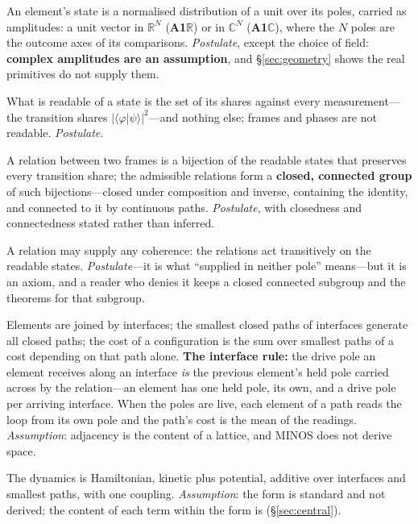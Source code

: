 \documentclass[11pt,a4paper]{article}
\theoremstyle{plain}
\theoremstyle{definition}
\theoremstyle{remark}
\newcommand{\R}{\mathbb{R}}
\newcommand{\C}{\mathbb{C}}
\begin{document}
\begin{tcolorbox}[paperbox, title=The axioms]
\begin{description}[leftmargin=1.5em,style=nextline]
\item[A1 --- the state.] An element's state is a normalised distribution of a unit over its poles, carried as amplitudes: a unit vector in $\R^N$ (\textbf{A1$\R$}) or in $\C^N$ (\textbf{A1$\C$}), where the $N$ poles are the outcome axes of its comparisons. \emph{Postulate}, except the choice of field: \textbf{complex amplitudes are an assumption}, and \S\ref{sec:geometry} shows the real primitives do not supply them.
\item[A2 --- the readable.] What is readable of a state is the set of its shares against every measurement---the transition shares $|\langle\varphi|\psi\rangle|^2$---and nothing else; frames and phases are not readable. \emph{Postulate.}
\item[A3 --- the relation.] A relation between two frames is a bijection of the readable states that preserves every transition share; the admissible relations form a \textbf{closed, connected group} of such bijections---closed under composition and inverse, containing the identity, and connected to it by continuous paths. \emph{Postulate}, with closedness and connectedness stated rather than inferred.
\item[A3b --- transitivity.] A relation may supply any coherence: the relations act transitively on the readable states. \emph{Postulate}---it is what ``supplied in neither pole'' means---but it is an axiom, and a reader who denies it keeps a closed connected subgroup and the theorems for that subgroup.
\item[A4 --- adjacency, the interface rule, locality.] Elements are joined by interfaces; the smallest closed paths of interfaces generate all closed paths; the cost of a configuration is the sum over smallest paths of a cost depending on that path alone. \textbf{The interface rule:} the drive pole an element receives along an interface \emph{is} the previous element's held pole carried across by the relation---an element has one held pole, its own, and a drive pole per arriving interface. When the poles are live, each element of a path reads the loop from its own pole and the path's cost is the mean of the readings. \emph{Assumption}: adjacency is the content of a lattice, and MINOS does not derive space.
\item[A5 --- the dynamics.] The dynamics is Hamiltonian, kinetic plus potential, additive over interfaces and smallest paths, with one coupling. \emph{Assumption}: the form is standard and not derived; the content of each term within the form is (\S\ref{sec:central}).

\end{description}
\end{tcolorbox}
\end{document}
